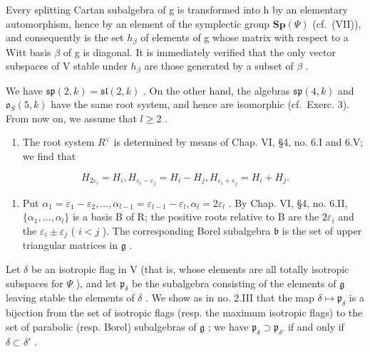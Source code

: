 Every splitting Cartan subalgebra of g is transformed into h by an elementary automorphism, hence by an element of the symplectic group \(\mathbf{Sp}(\varPsi)\) (cf.~(VII)), and consequently is the set \(h_{\beta}\) of elements of g whose matrix with respect to a Witt basis \(\beta\) of g is diagonal. It is immediately verified that the only vector subspaces of V stable under \(h_{\beta}\) are those generated by a subset of \(\beta\) .

We have \(\mathfrak{sp}(2,k) = \mathfrak{sl}(2,k)\) . On the other hand, the algebras \(\mathfrak{sp}(4,k)\) and \(\mathfrak{o}_S(5,k)\) have the same root system, and hence are isomorphic (cf.~Exerc. 3). From now on, we assume that \(l \geq 2\) .

\begin{enumerate}
\def\labelenumi{(\Roman{enumi})}
\setcounter{enumi}{1}
\tightlist
\item
  The root system \(R^{\vee}\) is determined by means of Chap. VI, §4, no. 6.I and 6.V; we find that
\end{enumerate}

\[
H _ {2 \varepsilon_ {i}} = H _ {i}, H _ {\varepsilon_ {i} - \varepsilon_ {j}} = H _ {i} - H _ {j}, H _ {\varepsilon_ {i} + \varepsilon_ {j}} = H _ {i} + H _ {j}.
\]

\begin{enumerate}
\def\labelenumi{(\Roman{enumi})}
\setcounter{enumi}{2}
\tightlist
\item
  Put \(\alpha_{1} = \varepsilon_{1} - \varepsilon_{2},\ldots ,\alpha_{l - 1} = \varepsilon_{l - 1} - \varepsilon_{l},\alpha_{l} = 2\varepsilon_{l}\) . By Chap. VI, §4, no. 6.II, \(\{\alpha_1,\dots ,\alpha_l\}\) is a basis B of R; the positive roots relative to B are the \(2\varepsilon_{i}\) and the \(\varepsilon_{i}\pm \varepsilon_{j}\) ( \(i < j\) ). The corresponding Borel subalgebra \(\mathfrak{b}\) is the set of upper triangular matrices in \(\mathfrak{g}\) .
\end{enumerate}

Let \(\delta\) be an isotropic flag in V (that is, whose elements are all totally isotropic subspaces for \(\varPsi\) ), and let \(\mathfrak{p}_{\delta}\) be the subalgebra consisting of the elements of \(\mathfrak{g}\) leaving stable the elements of \(\delta\) . We show as in no. 2.III that the map \(\delta \mapsto \mathfrak{p}_{\delta}\) is a bijection from the set of isotropic flags (resp. the maximum isotropic flags) to the set of parabolic (resp. Borel) subalgebras of \(\mathfrak{g}\) ; we have \(\mathfrak{p}_{\delta} \supset \mathfrak{p}_{\delta'}\) if and only if \(\delta \subset \delta'\) .

